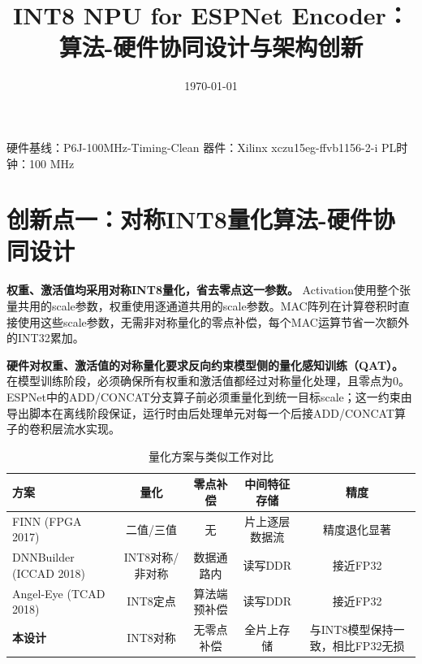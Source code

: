 \documentclass[11pt,a4paper]{article}
\begin{document}
\title{\textbf{INT8 NPU for ESPNet Encoder：算法-硬件协同设计与架构创新}}
\author{}
\date{\today}
\maketitle

\vspace{-8mm}
\begin{center}
\small 硬件基线：P6J-100MHz-Timing-Clean \quad 器件：Xilinx xczu15eg-ffvb1156-2-i \quad PL时钟：100 MHz
\end{center}


\section*{创新点一：对称INT8量化算法-硬件协同设计}

\textbf{权重、激活值均采用对称INT8量化，省去零点这一参数。} Activation使用整个张量共用的scale参数，权重使用逐通道共用的scale参数。MAC阵列在计算卷积时直接使用这些scale参数，无需非对称量化的零点补偿，每个MAC运算节省一次额外的INT32累加。

\textbf{硬件对权重、激活值的对称量化要求反向约束模型侧的量化感知训练（QAT）。} 在模型训练阶段，必须确保所有权重和激活值都经过对称量化处理，且零点为0。ESPNet中的ADD/CONCAT分支算子前必须重量化到统一目标scale；这一约束由导出脚本在离线阶段保证，运行时由后处理单元对每一个后接ADD/CONCAT算子的卷积层流水实现。

\begin{table}[h]
\centering
\caption{量化方案与类似工作对比}
\begin{tabular}{@{}lcccc@{}}
\toprule
方案 & 量化 & 零点补偿 & 中间特征存储 & 精度 \\
\midrule
FINN (FPGA 2017) & 二值/三值 & 无 & 片上逐层数据流 & 精度退化显著 \\
DNNBuilder (ICCAD 2018) & INT8对称/非对称 & 数据通路内 & 读写DDR & 接近FP32 \\
Angel-Eye (TCAD 2018) & INT8定点 & 算法端预补偿 & 读写DDR & 接近FP32 \\
\textbf{本设计} & INT8对称 & 无零点补偿 & 全片上存储 & 与INT8模型保持一致，相比FP32无损 \\
\bottomrule
\end{tabular}
\end{table}

\end{document}
